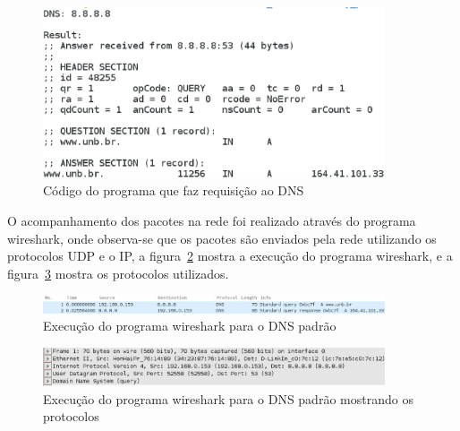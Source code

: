 \begin{figure}[h]
  \centering
  \includegraphics[width=0.9\textwidth]{figuras/ruby_other_dns.eps}
  \caption{Código do programa que faz requisição ao DNS}
  \label{fig:ruby_other_dns}
\end{figure}

O acompanhamento dos pacotes na rede foi realizado através do programa
wireshark, onde observa-se que os pacotes são enviados pela rede utilizando
os protocolos UDP e o IP, a figura~\ref{fig:wireshark_other_dns} mostra a
execução do programa wireshark, e a figura~\ref{fig:wireshark_other_dns_protocol} mostra
os protocolos utilizados.

\begin{figure}[h]
  \centering
  \includegraphics[width=0.9\textwidth]{figuras/wireshark_other_dns.eps}
  \caption{Execução do programa wireshark para o DNS padrão}
  \label{fig:wireshark_other_dns}
\end{figure}

\begin{figure}[h]
  \centering
  \includegraphics[width=0.9\textwidth]{figuras/wireshark_other_dns_protocol.eps}
  \caption{Execução do programa wireshark para o DNS padrão mostrando os protocolos}
  \label{fig:wireshark_other_dns_protocol}
\end{figure}
